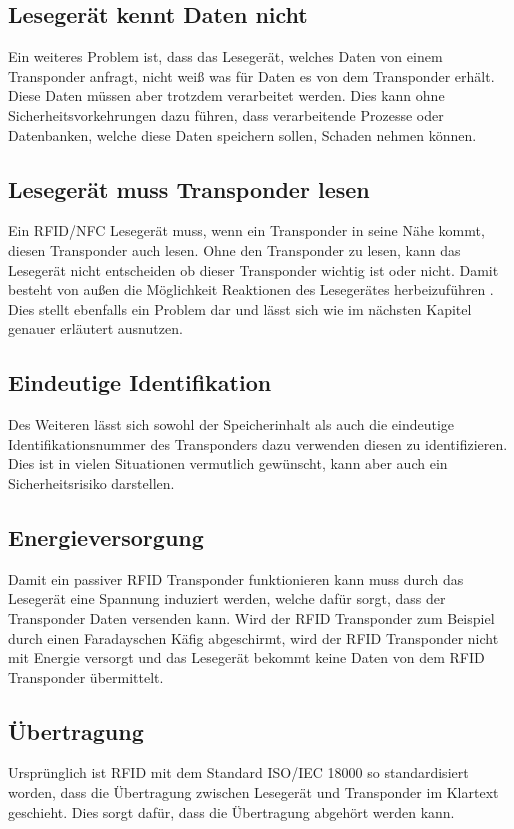 \documentclass[conference]{IEEEtran}
\begin{document}
\subsection{Lesegerät kennt Daten nicht}
Ein weiteres Problem ist, dass das Lesegerät, welches Daten von einem Transponder anfragt, nicht weiß was für Daten es von dem Transponder erhält. Diese Daten müssen aber trotzdem verarbeitet werden. Dies kann ohne Sicherheitsvorkehrungen dazu führen, dass verarbeitende Prozesse oder Datenbanken, welche diese Daten speichern sollen, Schaden nehmen können.

\subsection{Lesegerät muss Transponder lesen}
Ein RFID/NFC Lesegerät muss, wenn ein Transponder in seine Nähe kommt, diesen Transponder auch lesen. Ohne den Transponder zu lesen, kann das Lesegerät nicht entscheiden ob dieser Transponder wichtig ist oder nicht. Damit besteht von außen die Möglichkeit Reaktionen des Lesegerätes herbeizuführen \cite{b3}. Dies stellt ebenfalls ein Problem dar und lässt sich wie im nächsten Kapitel genauer erläutert ausnutzen.

\subsection{Eindeutige Identifikation}
Des Weiteren lässt sich sowohl der Speicherinhalt als auch die eindeutige Identifikationsnummer des Transponders dazu verwenden diesen zu identifizieren. Dies ist in vielen Situationen vermutlich gewünscht, kann aber auch ein Sicherheitsrisiko darstellen.

\subsection{Energieversorgung}
Damit ein passiver RFID Transponder funktionieren kann muss durch das Lesegerät eine Spannung induziert werden, welche dafür sorgt, dass der Transponder Daten versenden kann. Wird der RFID Transponder zum Beispiel durch einen Faradayschen Käfig abgeschirmt, wird der RFID Transponder nicht mit Energie versorgt und das Lesegerät bekommt keine Daten von dem RFID Transponder übermittelt.

\subsection{Übertragung}
Ursprünglich ist RFID mit dem Standard ISO/IEC 18000 so standardisiert worden, dass die Übertragung zwischen Lesegerät und Transponder im Klartext geschieht. Dies sorgt dafür, dass die Übertragung abgehört werden kann.
\end{document}
